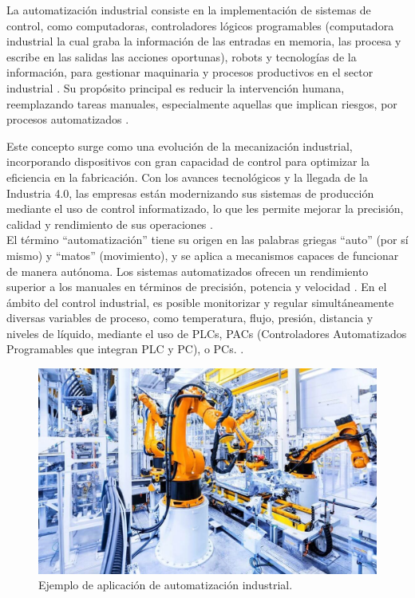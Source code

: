 La automatización industrial consiste en la implementación de sistemas de control, como computadoras, controladores lógicos programables (computadora industrial la cual graba la información de las entradas en memoria, las procesa y escribe en las salidas las acciones oportunas), robots y tecnologías de la información, para gestionar maquinaria y procesos productivos en el sector industrial \cite{definicion}. Su propósito principal es reducir la intervención humana, reemplazando tareas manuales, especialmente aquellas que implican riesgos, por procesos automatizados .

Este concepto surge como una evolución de la mecanización industrial, incorporando dispositivos con gran capacidad de control para optimizar la eficiencia en la fabricación. Con los avances tecnológicos y la llegada de la Industria 4.0, las empresas están modernizando sus sistemas de producción mediante el uso de control informatizado, lo que les permite mejorar la precisión, calidad y rendimiento de sus operaciones \cite{definicion}. \\

El término ``automatización'' tiene su origen en las palabras griegas ``auto'' (por sí mismo) y ``matos'' (movimiento), y se aplica a mecanismos capaces de funcionar de manera autónoma. Los sistemas automatizados ofrecen un rendimiento superior a los manuales en términos de precisión, potencia y velocidad \cite{definicion}. En el ámbito del control industrial, es posible monitorizar y regular simultáneamente diversas variables de proceso, como temperatura, flujo, presión, distancia y niveles de líquido, mediante el uso de PLCs, PACs (Controladores Automatizados Programables que integran PLC y PC), o PCs. \cite{definicion}. \\

\begin{figure} [h!]
  \begin{center}
    \includegraphics[width=13.5cm]{figs/automatizacion_industrial.jpg}
  \end{center}
  \caption{\centering Ejemplo de aplicación de automatización industrial.}
  \label{fig:automatizacion_industrial}
\end{figure}

